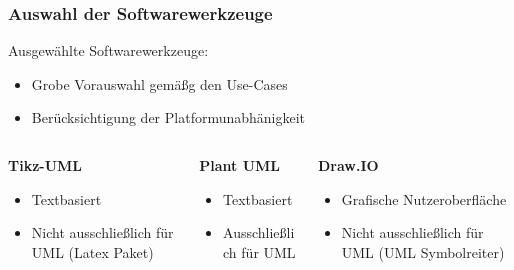 \documentclass[xcolor=dvipsnames]{beamer}
\begin{document}
\begin{frame}
	\frametitle{Auswahl der Softwarewerkzeuge}

\begin{block}{Ausgewählte Softwarewerkzeuge:}
	\begin{itemize}
		\item Grobe Vorauswahl gemäßg den Use-Cases
		\item Berücksichtigung der Platformunabhänigkeit
	\end{itemize}
\end{block}


\begin{columns}
	\begin{column}{0.333\textwidth}
		\begin{block}{\textbf{Tikz-UML}}
			\begin{itemize}
				\item Textbasiert
				\item Nicht ausschließlich für UML (Latex Paket)
			\end{itemize}
		\end{block}
	\end{column}
	
	\begin{column}{0.333\textwidth}
		\begin{block}{\textbf{Plant UML}}
			\begin{itemize}
				\item Textbasiert
				\item Ausschließlich für UML
			\end{itemize}
		\end{block}
	\end{column}

\begin{column}{0.333\textwidth}
	\begin{block}{\textbf{Draw.IO}}
		\begin{itemize}
			\item Grafische Nutzeroberfläche
			\item Nicht ausschließlich für UML (UML Symbolreiter)
		\end{itemize}
	\end{block}
\end{column}

\end{columns}
	
	
\end{frame}
\end{document}
